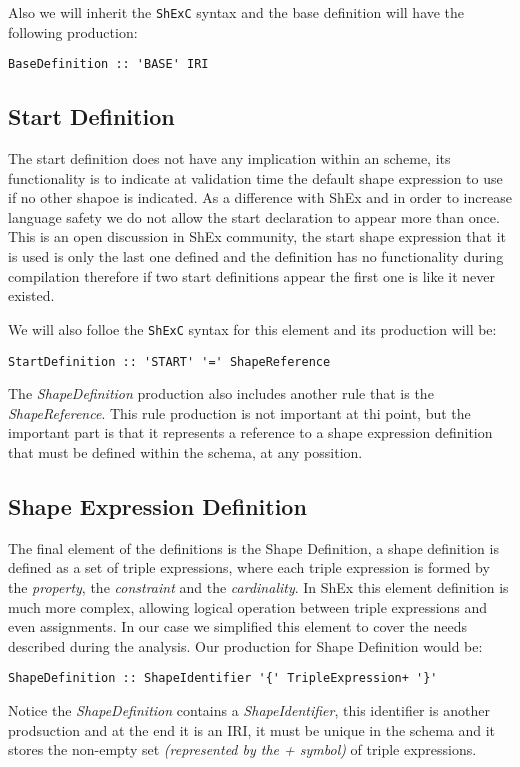 Also we will inherit the \texttt{ShExC} syntax and the base definition will have the following production:

\begin{center}
    \begin{verbatim}
BaseDefinition :: 'BASE' IRI
    \end{verbatim}
\end{center}

\subsection{Start Definition}
The start definition does not have any implication within an scheme, its functionality is to indicate at validation time the default shape expression to use
if no other shapoe is indicated. As a difference with ShEx and in order to increase language safety we do not allow the start declaration to appear more than once.
This is an open discussion in ShEx community, the start shape expression that it is used is only the last one defined and the definition has no functionality during
compilation therefore if two start definitions appear the first one is like it never existed.

We will also folloe the \texttt{ShExC} syntax for this element and its production will be:

\begin{center}
    \begin{verbatim}
StartDefinition :: 'START' '=' ShapeReference
    \end{verbatim}
\end{center}

The \textit{ShapeDefinition} production also includes another rule that is the \textit{ShapeReference}. This rule production is not important at thi point,
but the important part is that it represents a reference to a shape expression definition that must be defined within the schema, at any possition.

\subsection{Shape Expression Definition}
The final element of the definitions is the Shape Definition, a shape definition is defined as a set of triple expressions, where each triple
expression is formed by the \textit{property}, the \textit{constraint} and the \textit{cardinality}. In ShEx this element definition is much more
complex, allowing logical operation between triple expressions and even assignments. In our case we simplified this element to cover the needs described
during the analysis. Our production for Shape Definition would be:

\begin{center}
    \begin{verbatim}
ShapeDefinition :: ShapeIdentifier '{' TripleExpression+ '}'
    \end{verbatim}
\end{center}

Notice the \textit{ShapeDefinition} contains a \textit{ShapeIdentifier}, this identifier is another prodsuction and at the end it is an IRI, it must
be unique in the schema and it stores the non-empty set \textit{(represented by the + symbol)} of triple expressions.